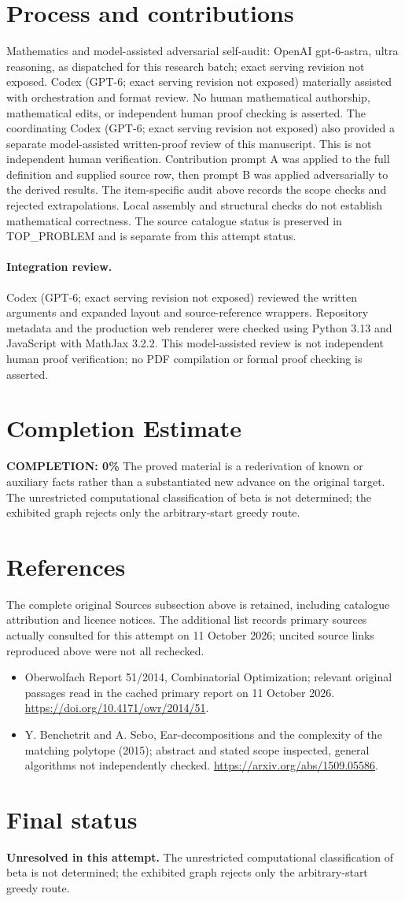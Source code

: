\documentclass[11pt]{article}
\begin{document}
\section{Process and contributions}
Mathematics and model-assisted adversarial self-audit: OpenAI gpt-6-astra, ultra reasoning, as dispatched for this research batch; exact serving revision not exposed. Codex (GPT-6; exact serving revision not exposed) materially assisted with orchestration and format review. No human mathematical authorship, mathematical edits, or independent human proof checking is asserted.
The coordinating Codex (GPT-6; exact serving revision not exposed) also provided a separate model-assisted written-proof review of this manuscript. This is not independent human verification.
Contribution prompt A was applied to the full definition and supplied source row, then prompt B was applied adversarially to the derived results. The item-specific audit above records the scope checks and rejected extrapolations. Local assembly and structural checks do not establish mathematical correctness. The source catalogue status is preserved in TOP\_PROBLEM and is separate from this attempt status.
\paragraph{Integration review.} Codex (GPT-6; exact serving revision not exposed) reviewed the written arguments and expanded layout and source-reference wrappers. Repository metadata and the production web renderer were checked using Python 3.13 and JavaScript with MathJax 3.2.2. This model-assisted review is not independent human proof verification; no PDF compilation or formal proof checking is asserted.

\section{Completion Estimate}
\noindent\textbf{COMPLETION: 0\%}
The proved material is a rederivation of known or auxiliary facts rather than a substantiated new advance on the original target. The unrestricted computational classification of beta is not determined; the exhibited graph rejects only the arbitrary-start greedy route.
\section{References}
The complete original Sources subsection above is retained, including catalogue attribution and licence notices. The additional list records primary sources actually consulted for this attempt on 11 October 2026; uncited source links reproduced above were not all rechecked.
\begin{itemize}
\item Oberwolfach Report 51/2014, Combinatorial Optimization; relevant original passages read in the cached primary report on 11 October 2026. \url{https://doi.org/10.4171/owr/2014/51}.
\item Y. Benchetrit and A. Sebo, Ear-decompositions and the complexity of the matching polytope (2015); abstract and stated scope inspected, general algorithms not independently checked. \url{https://arxiv.org/abs/1509.05586}.
\end{itemize}
\section{Final status}
\textbf{Unresolved in this attempt.} The unrestricted computational classification of beta is not determined; the exhibited graph rejects only the arbitrary-start greedy route.
\end{document}
